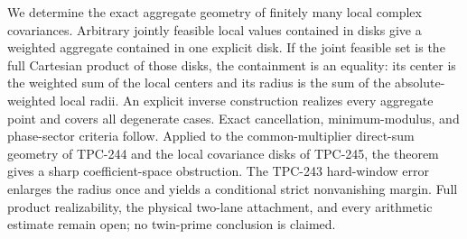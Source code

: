 We determine the exact aggregate geometry of finitely many local complex
covariances.  Arbitrary jointly feasible local values contained in disks give
a weighted aggregate contained in one explicit disk.  If the joint feasible
set is the full Cartesian product of those disks, the containment is an
equality: its center is the weighted sum of the local centers and its radius is
the sum of the absolute-weighted local radii.  An explicit inverse construction
realizes every aggregate point and covers all degenerate cases.  Exact
cancellation, minimum-modulus, and phase-sector criteria follow.  Applied to
the common-multiplier direct-sum geometry of TPC-244 and the local covariance
disks of TPC-245, the theorem gives a sharp coefficient-space obstruction.
The TPC-243 hard-window error enlarges the radius once and yields a conditional
strict nonvanishing margin.  Full product realizability, the physical two-lane
attachment, and every arithmetic estimate remain open; no twin-prime
conclusion is claimed.
